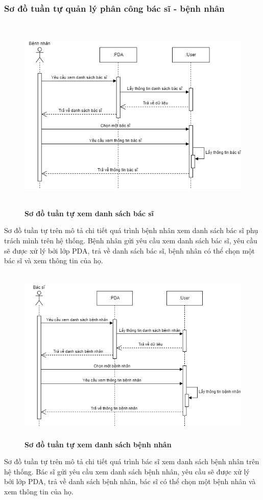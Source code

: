 \subsubsection{Sơ đồ tuần tự quản lý phân công bác sĩ - bệnh nhân}
\begin{figure}[H]
  \centering
  \includegraphics[width=13cm,height=9.5cm]{Images/sequence/sequence_manage_doctor.png}
  \caption[Sơ đồ tuần tự xem danh sách bác sĩ]{\bfseries \fontsize{12pt}{0pt}
  \selectfont Sơ đồ tuần tự xem danh sách bác sĩ}
  \label{sequence_manage_doctor} %
\end{figure}
Sơ đồ tuần tự trên mô tả chi tiết quá trình bệnh nhân xem danh sách bác sĩ phụ trách mình trên hệ thống. Bệnh nhân gửi yêu cầu xem danh sách bác sĩ, 
yêu cầu sẽ được xử lý bởi lớp PDA, trả về danh sách bác sĩ, bệnh nhân có thể chọn một bác sĩ và xem thông tin của họ. 
\begin{figure}[H]
  \centering
  \includegraphics[width=12cm,height=8.5cm]{Images/sequence/sequence_manage_patient.png}
  \caption[Sơ đồ tuần tự xem danh sách bệnh nhân]{\bfseries \fontsize{12pt}{0pt}
  \selectfont Sơ đồ tuần tự xem danh sách bệnh nhân}
  \label{sequence_manage_patient} %
\end{figure}
Sơ đồ tuần tự trên mô tả chi tiết quá trình bác sĩ xem danh sách bệnh nhân trên hệ thống. Bác sĩ gửi yêu cầu xem danh sách bệnh nhân, 
yêu cầu sẽ được xử lý bởi lớp PDA, trả về danh sách bệnh nhân, bác sĩ có thể chọn một bệnh nhân và xem thông tin của họ. 

